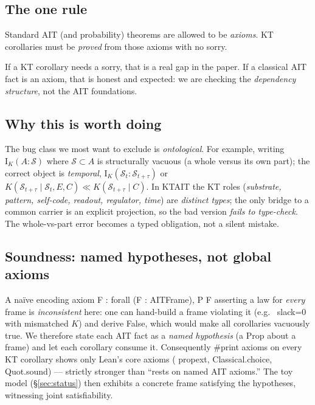 \documentclass[11pt,a4paper]{article}
\newcommand{\lean}[1]{{\ttfamily\small
  \let\leanunderscore\_\def\_{\leanunderscore\allowbreak}#1}}
\newcommand{\Ik}{\mathrm{I}_K}
\begin{document}
\subsection{The one rule}
\begin{thmbox}
Standard AIT (and probability) theorems are allowed to be \emph{axioms}. KT corollaries must be
\emph{proved} from those axioms with no \lean{sorry}.
\end{thmbox}
\noindent If a KT corollary needs a \lean{sorry}, that is a real gap in the paper. If a classical
AIT fact is an axiom, that is honest and expected: we are checking the \emph{dependency
structure}, not the AIT foundations.

\subsection{Why this is worth doing}
The bug class we most want to exclude is \emph{ontological}. For example, writing
$\Ik(A:\mathcal{S})$ where $\mathcal{S}\subset A$ is structurally vacuous (a whole versus its own
part); the correct object is \emph{temporal}, $\Ik(\mathcal{S}_t:\mathcal{S}_{t+\tau})$ or
$K(\mathcal{S}_{t+\tau}\mid \mathcal{S}_t,E,C)\ll K(\mathcal{S}_{t+\tau}\mid C)$. In \lean{KTAIT}
the KT roles (\emph{substrate, pattern, self-code, readout, regulator, time}) are \emph{distinct
types}; the only bridge to a common carrier is an explicit projection, so the bad version
\emph{fails to type-check}. The whole-vs-part error becomes a typed obligation, not a silent
mistake.

\subsection{Soundness: named hypotheses, not global axioms}
\label{sec:soundness}
A na\"ive encoding \lean{axiom F : forall (F : AITFrame), P F} asserting a law for \emph{every}
frame is \emph{inconsistent} here: one can hand-build a frame violating it (e.g.\ \lean{slack=0}
with mismatched $K$) and derive \lean{False}, which would make all corollaries vacuously true.
We therefore state each AIT fact as a \emph{named hypothesis} (a \lean{Prop} about a frame) and
let each corollary consume it. Consequently \lean{\#print axioms} on every KT corollary shows
only Lean's core axioms (\lean{propext}, \lean{Classical.choice}, \lean{Quot.sound}) --- strictly
stronger than ``rests on named AIT axioms.'' The toy model (\S\ref{sec:status}) then exhibits a
concrete frame satisfying the hypotheses, witnessing joint satisfiability.
\end{document}
